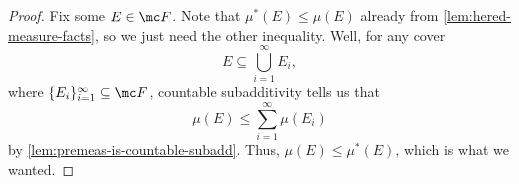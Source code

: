 \documentclass[../notes.tex]{subfiles}
\begin{document}
\begin{proof}
	Fix some $E\in\mc F$. Note that $\mu^*(E)\le\mu(E)$ already from \autoref{lem:hered-measure-facts}, so we just need the other inequality. Well, for any cover
	\[E\subseteq\bigcup_{i=1}^\infty E_i,\]
	where $\{E_i\}_{i=1}^\infty\subseteq\mc F$, countable subadditivity tells us that
	\[\mu(E)\le\sum_{i=1}^\infty\mu(E_i)\]
	by \autoref{lem:premeas-is-countable-subadd}. Thus, $\mu(E)\le\mu^*(E)$, which is what we wanted.
\end{proof}
\end{document}
